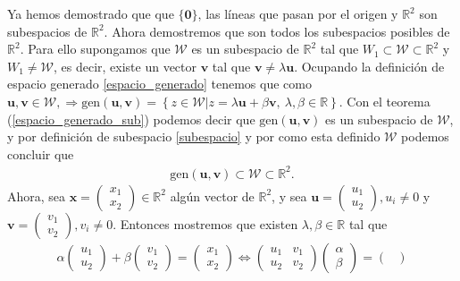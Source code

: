 \documentclass[11pt,letterpaper]{article}
\newcommand{\mR}{\mathbb{R}}
\newcommand{\gen}{\text{gen}}
\begin{document}
\begin{enumerate}
Ya hemos demostrado que que $\{\textbf{0}\}$, las líneas que pasan por el origen y $\mR^2$ son subespacios de $\mR^2$. Ahora demostremos que son todos los subespacios posibles de $\mR^2$. Para ello supongamos que $\mathcal{W}$ es un subespacio de $\mR^2$ tal que $W_1\subset \mathcal{W}\subset \mR^2$ y $W_1\neq \mathcal{W}$, es decir, existe un vector $\textbf{v}$ tal que $\textbf{v}\neq \lambda\textbf{u}$. Ocupando la definición de espacio generado \ref{espacio_generado} tenemos que como $\textbf{u},\textbf{v}\in \mathcal{W}, \Rightarrow \gen (\textbf{u},\textbf{v})=\left\{z\in \mathcal{W}|z=\lambda \textbf{u}+\beta \textbf{v}, \ \lambda, \beta \in \mR\right\}.$ Con el teorema (\ref{espacio_generado_sub}) podemos decir que $\gen(\textbf{u},\textbf{v})$ es un subespacio de $\mathcal{W}$, y por definición de subespacio \ref{subespacio} y por como esta definido $\mathcal{W}$ podemos concluir que 
\begin{align}\label{parte_1}
\gen(\textbf{u},\textbf{v})\subset \mathcal{W}\subset \mR^2.
\end{align}
Ahora, sea $\textbf{x}=\begin{pmatrix}
x_1\\
x_2
\end{pmatrix}\in \mR^2$ algún vector de $\mR^2$, y sea $\textbf{u}=\begin{pmatrix}
u_1\\
u_2
\end{pmatrix}, u_i\neq 0$ y $\textbf{v}=\begin{pmatrix}
v_1\\
v_2
\end{pmatrix}, v_i\neq 0.$ Entonces mostremos que existen $\lambda, \beta\in \mR$ tal que 
\begin{align*}
\alpha\begin{pmatrix}
u_1\\
u_2
\end{pmatrix} +\beta \begin{pmatrix}
v_1\\
v_2
\end{pmatrix}=\begin{pmatrix}
x_1\\
x_2
\end{pmatrix} \Leftrightarrow \begin{pmatrix}
u_1&v_1\\
u_2&v_2
\end{pmatrix}\begin{pmatrix}
\alpha\\
\beta
\end{pmatrix}=\begin{pmatrix}

\end{pmatrix}
\end{align*}
\end{enumerate}
\end{document}
